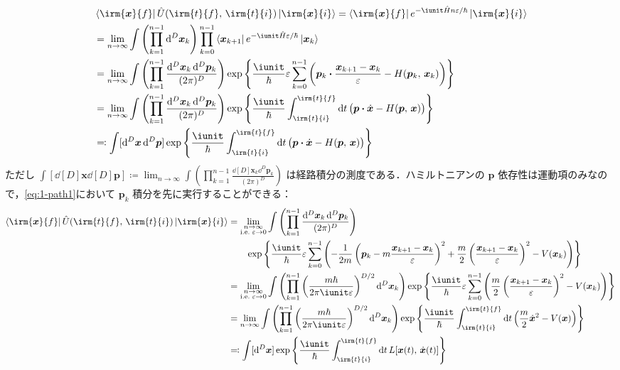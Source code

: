 \documentclass[TQFT_main]{subfiles}
\begin{document}
\begin{align}
    &\bra{\irm{\bm{x}}{f}} \hat{U}(\irm{t}{f},\, \irm{t}{i}) \ket{\irm{\bm{x}}{i}} 
    = \bra{\irm{\bm{x}}{f}} e^{-\iunit \hat{H}n\varepsilon /\hbar} \ket{\irm{\bm{x}}{i}} \\
    &= \lim_{n\to \infty}\int \left(\prod_{k=1}^{n-1} \dd[D]{\bm{x}_k} \right) \prod_{k=0}^{n-1} \bra{\bm{x}_{k+1}} e^{-\iunit \hat{H} \varepsilon / \hbar} \ket{\bm{x}_k} \\
    &= \lim_{n\to \infty}\int \left(\prod_{k=1}^{n-1}  \frac{\dd[D]{\bm{x}_k}\dd^D \bm{p}_k}{(2\pi)^D} \right) \exp\left\{ \frac{\iunit}{\hbar} \varepsilon \sum_{k=0}^{n-1} \left(\bm{p}_k \vdot \frac{\bm{x}_{k+1} - \bm{x}_k }{\varepsilon} - H (\bm{p}_k,\, \bm{x}_k) \right)  \right\}  \label{eq:1-path1} \\ 
    &= \lim_{n\to \infty}\int \left(\prod_{k=1}^{n-1}  \frac{\dd[D]{\bm{x}_k}\dd^D \bm{p}_k}{(2\pi)^D} \right) \exp\left\{ \frac{\iunit}{\hbar} \int_{\irm{t}{i}}^{\irm{t}{f}} \dd{t} \bigl(\bm{p} \vdot \dot{\bm{x}} - H (\bm{p},\, \bm{x}) \bigr)  \right\} \\
    &\eqqcolon \int [\dd[D]{\bm{x}} \dd[D]{\bm{p}}] \exp\left\{ \frac{\iunit}{\hbar} \int_{\irm{t}{i}}^{\irm{t}{f}} \dd{t} \bigl(\bm{p} \vdot \dot{\bm{x}} - H (\bm{p},\, \bm{x}) \bigr)  \right\}
\end{align}
ただし $\int [\dd[D]{\bm{x}} \dd[D]{\bm{p}}] \coloneqq \lim_{n\to \infty}\int \left(\prod_{k=1}^{n-1}  \frac{\dd[D]{\bm{x}_k}\dd^D \bm{p}_k}{(2\pi)^D} \right)$ は経路積分の測度である．ハミルトニアンの $\bm{p}$ 依存性は運動項のみなので，\eqref{eq:1-path1}において $\bm{p}_k$ 積分を先に実行することができる：
\begin{align}
    \bra{\irm{\bm{x}}{f}} \hat{U}(\irm{t}{f},\, \irm{t}{i}) \ket{\irm{\bm{x}}{i}} 
    &= \lim_{\substack{n\to \infty \\ \mathrm{i.e.}\; \varepsilon \to 0}}\int \left(\prod_{k=1}^{n-1}  \frac{\dd[D]{\bm{x}_k}\dd^D \bm{p}_k}{(2\pi)^D} \right) \\
    &\qquad \exp\left\{ \frac{\iunit}{\hbar} \varepsilon \sum_{k=0}^{n-1} \left(- \frac{1}{2m} \left( \bm{p}_k - m\frac{\bm{x}_{k+1} - \bm{x}_k}{\varepsilon} \right)^2 + \frac{m}{2} \left( \frac{\bm{x}_{k+1} - \bm{x}_k}{\varepsilon} \right)^2 - V(\bm{x}_k) \right)  \right\} \\ 
    &= \lim_{\substack{n\to \infty \\ \mathrm{i.e.}\; \varepsilon \to 0}}\int \left(\prod_{k=1}^{n-1}  \left(\frac{m\hbar}{2\pi \iunit \varepsilon}\right)^{D/2} \dd[D]{\bm{x}_k} \right) \exp\left\{ \frac{\iunit}{\hbar} \varepsilon \sum_{k=0}^{n-1} \left(\frac{m}{2} \left( \frac{\bm{x}_{k+1} - \bm{x}_k}{\varepsilon} \right)^2 - V(\bm{x}_k) \right)  \right\} \\
    &= \lim_{n\to \infty}\int \left(\prod_{k=1}^{n-1}  \left(\frac{m\hbar}{2\pi \iunit \varepsilon}\right)^{D/2} \dd[D]{\bm{x}_k} \right) \exp\left\{ \frac{\iunit}{\hbar} \int_{\irm{t}{i}}^{\irm{t}{f}} \dd{t} \left(\frac{m}{2} \dot{\bm{x}}^2 - V(\bm{x}) \right)  \right\} \\
    &\eqqcolon \int [\dd[D]{\bm{x}}] \exp \left\{ \frac{\iunit}{\hbar} \int_{\irm{t}{i}}^{\irm{t}{f}} \dd{t} L [\bm{x}(t),\, \dot{\bm{x}} (t)] \right\} 
\end{align}
\end{document}

